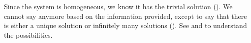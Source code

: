 Since the system is homogeneous, we know it has the trivial solution ().  We cannot say anymore based on the information provided, except to say that there is either a unique solution or infinitely many solutions (). See  and  to understand the possibilities.
